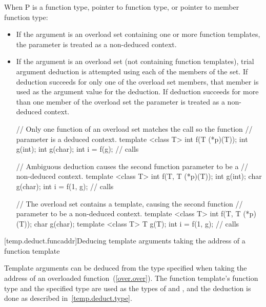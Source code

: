 \pnum
When P is a function type, pointer to function type, or pointer to member
function type:
\begin{itemize}
\item
If the argument is an overload set containing one or more function templates,
the parameter is treated as a non-deduced context.
\item
If the argument is an overload set (not containing function templates), trial
argument deduction is attempted using each of the members of the set. If
deduction succeeds for only one of the overload set members, that member is
used as the argument value for the deduction. If deduction succeeds for more than
one member of the overload set the parameter is treated as a non-deduced context.

\pnum
\enterexample
\begin{codeblock}
// Only one function of an overload set matches the call so the function
// parameter is a deduced context.
template <class T> int f(T (*p)(T));
int g(int);
int g(char);
int i = f(g);       // calls 
\end{codeblock}
\exitexample

\pnum
\enterexample
\begin{codeblock}
// Ambiguous deduction causes the second function parameter to be a
// non-deduced context.
template <class T> int f(T, T (*p)(T));
int g(int);
char g(char);
int i = f(1, g);    // calls 
\end{codeblock}
\exitexample

\pnum
\enterexample
\begin{codeblock}
// The overload set contains a template, causing the second function
// parameter to be a non-deduced context.
template <class T> int f(T, T (*p)(T));
char g(char);
template <class T> T g(T);
int i = f(1, g);    // calls 
\end{codeblock}
\exitexample
\end{itemize}

[temp.deduct.funcaddr]{Deducing template arguments taking the address of a function template}

\pnum
Template arguments can be deduced from the type specified when taking
the address of an overloaded function~(\ref{over.over}).
The function template's function type and the specified type
are used as the types of
and
,
and the deduction is done as
described in~\ref{temp.deduct.type}.

